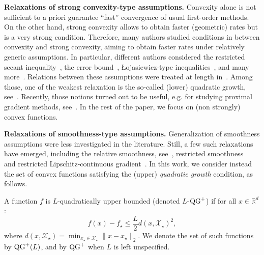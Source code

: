 \textbf{Relaxations of strong convexity-type assumptions.} Convexity alone is not sufficient to a priori guarantee ``fast'' convergence of usual first-order methods. On the other hand, strong convexity allows to obtain faster (geometric) rates but is a very strong condition. Therefore, many authors studied conditions in between convexity and strong convexity, aiming to obtain faster rates under relatively generic assumptions. In particular, different authors considered the restricted secant inequality~\citep{zhang2013gradient, guille2022gradient}, the error bound~\citep{luo_error_1993}, {\L}ojasiewicz-type inequalities~\citep{polyak_gradient_1963}, and many more~\citep{NIPS2015_5718,kurdyka1998gradients,liu2014asynchronous,gong2014linear,necoara2016linear,hardt2016gradient,abbaszadehpeivasti2022conditions}. Relations between these assumptions were treated at length in~\citep{bolte2017error,zhang2017restricted}. Among those, one of the weakest relaxation is the so-called (lower) quadratic growth, see~\citep{bonnans1993second, ioffe1994sensitivity,anitescu2000degenerate}. Recently, those notions turned out to be useful, e.g. for studying proximal gradient methods, see~\citep{cui2017quadratic, drusvyatskiy2016error, drusvyatskiy2015quadratic, zhang2020, zhang2017linear,chieu2021quadratic}. In the rest of the paper, we focus on (non strongly) convex functions.

\textbf{Relaxations of smoothness-type assumptions.} Generalization of smoothness assumptions were less investigated in the literature. Still, a few such relaxations have emerged, including the {relative smoothness}, see~\citep{bauschke2017descent,lu2016relativelysmooth,dragomir2021optimal, hanzely2018accelerated}, restricted smoothness~\citep{agarwal2011fast} and restricted Lipschitz-continuous gradient~\citep{zhang2013gradient}. In this work, we consider instead the set of convex functions satisfying the (upper) \textit{quadratic growth} condition, as follows.

\begin{Def}
    A function $f$ is $L$-quadratically upper bounded (denoted $L$-$\operatorname{QG}^+$) if for all $x \in \mathbb{R}^d$: \[f(x)-f_\star \leq \frac{L}{2} d(x, \mathcal{X}_\star)^2,\]
    where $d(x, \mathcal{X}_\star) = \min_{x_\star \in \mathcal{X}_\star} \|x-x_\star\|_2$.
    We denote the set of such functions by $\operatorname{QG}^+(L)$, and by $\operatorname{QG}^+$ when $L$ is left unspecified. 
\end{Def}

